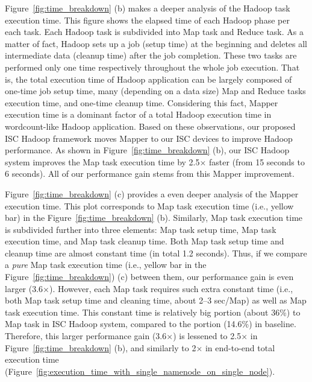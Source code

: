 Figure~\ref{fig:time_breakdown} (b) makes a deeper analysis of the Hadoop task execution time. This figure shows the elapsed time of each Hadoop phase per each task. Each Hadoop task is subdivided into Map task and Reduce task. As a matter of fact, Hadoop sets up a job (setup time) at the beginning and deletes all intermediate data (cleanup time) after the job completion. These two tasks are performed only one time respectively throughout the whole job execution. That is, the total execution time of Hadoop application can be largely composed of one-time job setup time, many (depending on a data size) Map and Reduce tasks execution time, and one-time cleanup time. Considering this fact, Mapper execution time is a dominant factor of a total Hadoop execution time in wordcount-like Hadoop application. Based on these observations, our proposed ISC Hadoop framework moves Mapper to our ISC devices to improve Hadoop performance. As shown in Figure~\ref{fig:time_breakdown} (b), our ISC Hadoop system improves the Map task execution time by 2.5$\times$ faster (from 15 seconds to 6 seconds). All of our performance gain stems from this Mapper improvement.  





Figure~\ref{fig:time_breakdown} (c) provides a even deeper analysis of the Mapper execution time. This plot corresponds to Map task execution time (i.e., yellow bar) in the Figure~\ref{fig:time_breakdown} (b). Similarly, Map task execution time is subdivided further into three elements: Map task setup time, Map task execution time, and Map task cleanup time. Both Map task setup time and cleanup time are almost constant time (in total 1.2 seconds). Thus, if we compare a \emph{pure} Map task execution time (i.e., yellow bar in the Figure~\ref{fig:time_breakdown}) (c) between them, our performance gain is even larger (3.6$\times$). However, each Map task requires such extra constant time (i.e., both Map task setup time and cleaning time, about 2--3 sec/Map) as well as Map task execution time. This constant time is relatively big portion (about 36\%) to Map task in ISC Hadoop system, compared to the portion (14.6\%) in baseline. Therefore, this larger performance gain (3.6$\times$) is lessened to 2.5$\times$ in Figure~\ref{fig:time_breakdown} (b), and similarly to 2$\times$ in end-to-end total execution time (Figure~\ref{fig:execution_time_with_single_namenode_on_single_node}).



